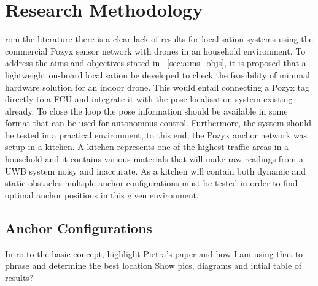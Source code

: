 \chapter{Research Methodology}\label{ch:research-methodology}
rom the literature there is a clear lack of results for localisation systems using the commercial Pozyx sensor network with drones in an household environment.
To address the aims and objectives stated in ~\ref{sec:aims_objs}, it is proposed that a lightweight on-board localisation be developed to check the feasibility of minimal hardware solution for an indoor drone.
This would entail connecting a Pozyx tag directly to a FCU and integrate it with the pose localisation system existing already.
To close the loop the pose information should be available in some format that can be used for autonomous control.
Furthermore, the system should be tested in a practical environment, to this end, the Pozyx anchor network was setup in a kitchen.
A kitchen represents one of the highest traffic areas in a household and it contains various materials that will make raw readings from a UWB system noisy and inaccurate.
As a kitchen will contain both dynamic and static obstacles multiple anchor configurations must be tested in order to find optimal anchor positions in this given environment.

\section{Anchor Configurations}\label{sec:anchor-configurations}
Intro to the basic concept, highlight Pietra's paper and how I am using that to phrase and determine the best location
Show pics, diagrams and intial table of results?
